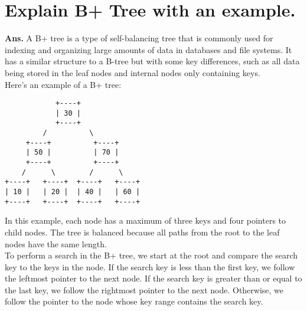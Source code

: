 \documentclass{article}
\begin{document}
\section{\textbf{Explain B+ Tree with an example.}}
\textbf{Ans.} A B+ tree is a type of self-balancing tree that is commonly used for indexing and organizing large amounts of data in databases and file systems. It has a similar structure to a B-tree but with some key differences, such as all data being stored in the leaf nodes and internal nodes only containing keys.\\

Here's an example of a B+ tree:
\begin{lstlisting}
            +----+
            | 30 |
            +----+
         /          \
     +----+          +----+
     | 50 |          | 70 |
     +----+          +----+
    /      \        /      \
+----+   +----+  +----+   +----+
| 10 |   | 20 |  | 40 |   | 60 |
+----+   +----+  +----+   +----+

\end{lstlisting}
In this example, each node has a maximum of three keys and four pointers to child nodes. The tree is balanced because all paths from the root to the leaf nodes have the same length.\\

To perform a search in the B+ tree, we start at the root and compare the search key to the keys in the node. If the search key is less than the first key, we follow the leftmost pointer to the next node. If the search key is greater than or equal to the last key, we follow the rightmost pointer to the next node. Otherwise, we follow the pointer to the node whose key range contains the search key.\\
\end{document}

